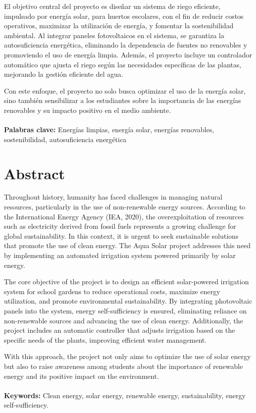 \documentclass[12pt]{article}
\begin{document}
El objetivo central del proyecto es diseñar un sistema de riego eficiente, impulsado por energía solar, para huertos escolares, con el fin de reducir costos operativos, maximizar la utilización de energía, y fomentar la sostenibilidad ambiental. Al integrar paneles fotovoltaicos en el sistema, se garantiza la autosuficiencia energética, eliminando la dependencia de fuentes no renovables y promoviendo el uso de energía limpia. Además, el proyecto incluye un controlador automático que ajusta el riego según las necesidades específicas de las plantas, mejorando la gestión eficiente del agua.\cite{iea2020}

Con este enfoque, el proyecto no solo busca optimizar el uso de la energía solar, sino también sensibilizar a los estudiantes sobre la importancia de las energías renovables y su impacto positivo en el medio ambiente.
\\~\\
\textbf{Palabras clave:} Energías limpias, energía solar, energías renovables, sostenibilidad, autosuficiencia energética
\newpage
\section*{Abstract}
Throughout history, humanity has faced challenges in managing natural resources, particularly in the use of non-renewable energy sources. According to the International Energy Agency (IEA, 2020), the overexploitation of resources such as electricity derived from fossil fuels represents a growing challenge for global sustainability. In this context, it is urgent to seek sustainable solutions that promote the use of clean energy. The Aqua Solar project addresses this need by implementing an automated irrigation system powered primarily by solar energy.

The core objective of the project is to design an efficient solar-powered irrigation system for school gardens to reduce operational costs, maximize energy utilization, and promote environmental sustainability. By integrating photovoltaic panels into the system, energy self-sufficiency is ensured, eliminating reliance on non-renewable sources and advancing the use of clean energy. Additionally, the project includes an automatic controller that adjusts irrigation based on the specific needs of the plants, improving efficient water management. \cite{iea2020}

With this approach, the project not only aims to optimize the use of solar energy but also to raise awareness among students about the importance of renewable energy and its positive impact on the environment.
\\~\\
\textbf{Keywords:} Clean energy, solar energy, renewable energy, sustainability, energy self-sufficiency.
\newpage
\renewcommand{\contentsname}{Tabla de Contenido}
\tableofcontents
\end{document}
